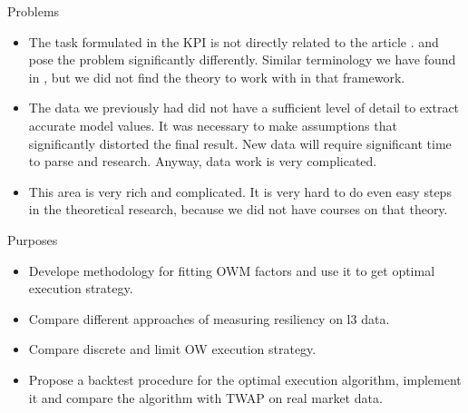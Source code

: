 \documentclass[]{beamer}
\begin{document}
\begin{frame}[t]
\begin{columns}[t]
\begin{column}{\onecolwid}
        \begin{block}{Problems}
            \begin{itemize}
                \item The task formulated in the KPI is not directly related to the article \cite{obizhaeva2013optimal}. 
                \cite{obizhaeva2013optimal} and \cite{velu2020algorithmic} pose the problem significantly differently. 
                Similar terminology we have found in \cite{webster2023handbook}, but 
                we did not find the theory to work with in that framework.
                \item The data we previously had did not have a sufficient level of detail to extract accurate model values. 
                It was necessary to make assumptions that significantly distorted the final result. 
                New data will require significant time to parse and research. Anyway, data work is very complicated.
                \item This area is very rich and complicated. It is very hard to do even easy steps in the theoretical research, 
                because we did not have courses on that theory. 
                
            \end{itemize}

            
            \end{block}


        \begin{block}{Purposes}
        \begin{itemize}
            \item Develope methodology for fitting OWM factors and use it to get optimal execution strategy.
            \item Compare different approaches of measuring resiliency on l3 data.
            \item Compare discrete and limit OW execution strategy.
            \item Propose a backtest procedure for the optimal execution algorithm, implement it and compare the algorithm with TWAP
            on real market data.
        \end{itemize}
        
        \end{block}
        
        

\end{column}
\end{columns}
\end{frame}
\end{document}
